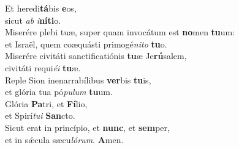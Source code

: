\oddverse Et heredi\textbf{tá}bis \textbf{e}os,~\*\\
\oddverse sicut \textit{ab} \textit{i}\textbf{ní}\textbf{ti}o.\\
\evenverse Miserére plebi tuæ, super quam invocátum est \textbf{no}men \textbf{tu}um:~\*\\
\evenverse et Israël, quem coæquásti primogé\textit{ni}\textit{to} \textbf{tu}o.\\
\oddverse Miserére civitáti sanctificatiónis \textbf{tu}æ Je\textbf{rú}salem,~\*\\
\oddverse civitáti requi\textit{é}\textit{i} \textbf{tu}æ.\\
\evenverse Reple Sion inenarrabílibus \textbf{ver}bis \textbf{tu}is,~\*\\
\evenverse et glória tua pó\textit{pu}\textit{lum} \textbf{tu}um.\\
\oddverse Glória \textbf{Pa}tri, et \textbf{Fí}lio,~\*\\
\oddverse et Spirí\textit{tu}\textit{i} \textbf{San}cto.\\
\evenverse Sicut erat in princípio, et \textbf{nunc}, et \textbf{sem}per,~\*\\
\evenverse et in sǽcula sæcu\textit{ló}\textit{rum}. \textbf{A}men.\\
